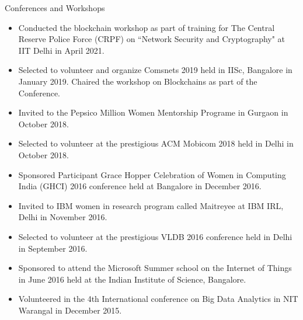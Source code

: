 \documentclass{resume} %
\begin{document}
\begin{rSection}{Conferences and Workshops}
\begin{itemize}

\item Conducted the blockchain workshop as part of training for The Central Reserve Police Force (CRPF) on ``Network Security and Cryptography" at IIT Delhi in April 2021.


\item Selected to volunteer and organize Comsnets 2019 held in IISc, Bangalore in January 2019. Chaired the workshop on Blockchains as part of the Conference.

\item Invited to the Pepsico Million Women Mentorship Programe in Gurgaon in October 2018.

\item Selected to volunteer at the prestigious ACM Mobicom 2018 held in Delhi in October 2018.


\item Sponsored Participant Grace Hopper Celebration of Women in Computing India (GHCI) 2016 conference held at Bangalore in December 2016.

\item Invited to IBM women in research program called Maitreyee at IBM IRL, Delhi in November 2016.

\item Selected to volunteer at the prestigious VLDB 2016 conference held in Delhi in September 2016.

\item Sponsored to attend the Microsoft Summer school on the Internet of Things in June 2016 held at the Indian Institute of Science, Bangalore.

 \item Volunteered in the 4th International conference on Big Data Analytics in NIT Warangal in December 2015.


\end{itemize}


\end{rSection}
\end{document}
